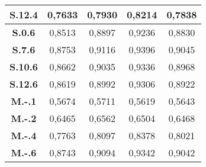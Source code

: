 \begin{apendicesenv}
\begin{table}[!htb]
\begin{tabular}{|c|c|c|c|c|}
\textbf{S.12.4} & 0,7633      & 0,7930      & 0,8214      & 0,7838      \\ \hline
\textbf{S.0.6}  & 0,8513      & 0,8897      & 0,9236      & 0,8830      \\ \hline
\textbf{S.7.6}  & 0,8753      & 0,9116      & 0,9396      & 0,9045      \\ \hline
\textbf{S.10.6} & 0,8662      & 0,9035      & 0,9336      & 0,8968      \\ \hline
\textbf{S.12.6} & 0,8619      & 0,8992      & 0,9306      & 0,8922      \\ \hline
\textbf{M.-.1}  & 0,5674      & 0,5711      & 0,5619      & 0,5643      \\ \hline
\textbf{M.-.2}  & 0,6465      & 0,6562      & 0,6504      & 0,6468      \\ \hline
\textbf{M.-.4}  & 0,7763      & 0,8097      & 0,8378      & 0,8021      \\ \hline
\textbf{M.-.6}  & 0,8743      & 0,9094      & 0,9342      & 0,9042      \\ \hline
\end{tabular}
\end{table}


\end{apendicesenv}
